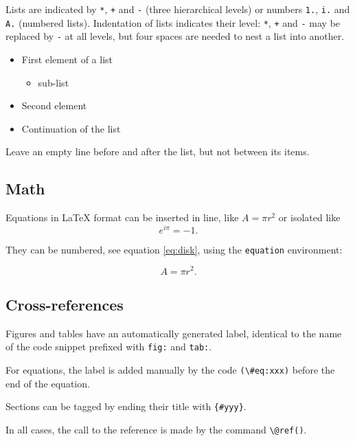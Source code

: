 \documentclass[fleqn,]{article} %
\providecommand{\tightlist}{%
  \setlength{\itemsep}{0pt}\setlength{\parskip}{0pt}}
\begin{document}
Lists are indicated by \texttt{*}, \texttt{+} and \texttt{-} (three hierarchical levels) or numbers \texttt{1.}, \texttt{i.} and \texttt{A.} (numbered lists).
Indentation of lists indicates their level: \texttt{*}, \texttt{+} and \texttt{-} may be replaced by \texttt{-} at all levels, but four spaces are needed to nest a list into another.

\begin{itemize}
\tightlist
\item
  First element of a list

  \begin{itemize}
  \tightlist
  \item
    sub-list
  \end{itemize}
\item
  Second element
\item
  Continuation of the list
\end{itemize}

Leave an empty line before and after the list, but not between its items.

\hypertarget{math}{%
\subsection{Math}\label{math}}

Equations in LaTeX format can be inserted in line, like \(A=\pi r^2\) or isolated like \[e^{i \pi} = -1.\]

They can be numbered, see equation \eqref{eq:disk}, using the \texttt{equation} environment:

\begin{equation}
  A = \pi r^2.
  \label{eq:disk}
\end{equation}

\hypertarget{cross-references}{%
\subsection{Cross-references}\label{cross-references}}

Figures and tables have an automatically generated label, identical to the name of the code snippet prefixed with \texttt{fig:} and \texttt{tab:}.

For equations, the label is added manually by the code \texttt{(\textbackslash{}\#eq:xxx)} before the end of the equation.

Sections can be tagged by ending their title with \texttt{\{\#yyy\}}.

In all cases, the call to the reference is made by the command \texttt{\textbackslash{}@ref()}.
\end{document}
